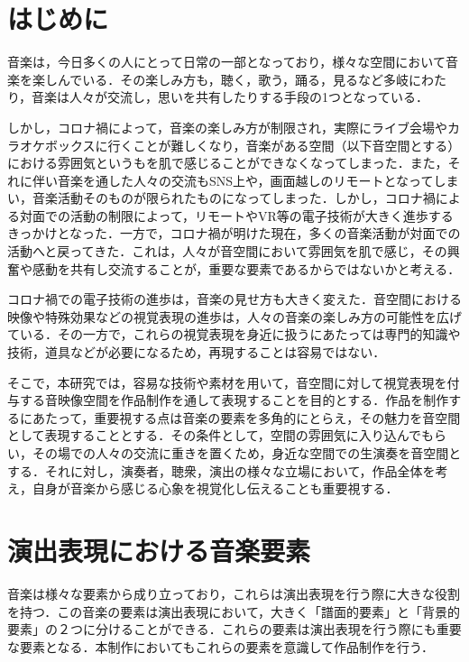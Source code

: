 
\section{はじめに}
音楽は，今日多くの人にとって日常の一部となっており，様々な空間において音楽を楽しんでいる．その楽しみ方も，聴く，歌う，踊る，見るなど多岐にわたり，音楽は人々が交流し，思いを共有したりする手段の1つとなっている．

しかし，コロナ禍によって，音楽の楽しみ方が制限され，実際にライブ会場やカラオケボックスに行くことが難しくなり，音楽がある空間（以下音空間とする）における雰囲気というもを肌で感じることができなくなってしまった．また，それに伴い音楽を通した人々の交流もSNS上や，画面越しのリモートとなってしまい，音楽活動そのものが限られたものになってしまった．しかし，コロナ禍による対面での活動の制限によって，リモートやVR等の電子技術が大きく進歩するきっかけとなった．一方で，コロナ禍が明けた現在，多くの音楽活動が対面での活動へと戻ってきた．これは，人々が音空間において雰囲気を肌で感じ，その興奮や感動を共有し交流することが，重要な要素であるからではないかと考える．

コロナ禍での電子技術の進歩は，音楽の見せ方も大きく変えた．音空間における映像や特殊効果などの視覚表現の進歩は，人々の音楽の楽しみ方の可能性を広げている．その一方で，これらの視覚表現を身近に扱うにあたっては専門的知識や技術，道具などが必要になるため，再現することは容易ではない．

そこで，本研究では，容易な技術や素材を用いて，音空間に対して視覚表現を付与する音映像空間を作品制作を通して表現することを目的とする．作品を制作するにあたって，重要視する点は音楽の要素を多角的にとらえ，その魅力を音空間として表現することとする．その条件として，空間の雰囲気に入り込んでもらい，その場での人々の交流に重きを置くため，身近な空間での生演奏を音空間とする．それに対し，演奏者，聴衆，演出の様々な立場において，作品全体を考え，自身が音楽から感じる心象を視覚化し伝えることも重要視する．




\section{演出表現における音楽要素}\label{sec:music_factor}

音楽は様々な要素から成り立っており，これらは演出表現を行う際に大きな役割を持つ．この音楽の要素は演出表現において，大きく「譜面的要素」と「背景的要素」の２つに分けることができる．これらの要素は演出表現を行う際にも重要な要素となる．本制作においてもこれらの要素を意識して作品制作を行う．

